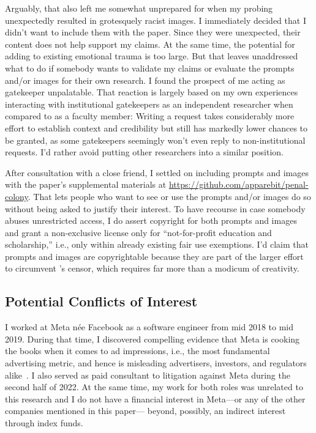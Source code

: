 Arguably, that also left me somewhat unprepared for when my probing unexpectedly
resulted in grotesquely racist images. I immediately decided that I didn't want
to include them with the paper. Since they were unexpected, their content does
not help support my claims. At the same time, the potential for adding to
existing emotional trauma is too large. But that leaves unaddressed what to do
if somebody wants to validate my claims or evaluate the prompts and/or images
for their own research. I found the prospect of me acting as gatekeeper
unpalatable. That reaction is largely based on my own experiences interacting
with institutional gatekeepers as an independent researcher when compared to as
a faculty member: Writing a request takes considerably more effort to establish
context and credibility but still has markedly lower chances to be granted, as
some gatekeepers seemingly won't even reply to non-institutional requests. I'd
rather avoid putting other researchers into a similar position.

After consultation with a close friend, I settled on including prompts and
images with the paper's supplemental materials at
\url{https://github.com/apparebit/penal-colony}. That lets people who want to
see or use the prompts and/or images do so without being asked to justify their
interest. To have recourse in case somebody abuses unrestricted access, I do
assert copyright for both prompts and images and grant a non-exclusive license
only for ``not-for-profit education and scholarship,'' i.e., only within already
existing fair use exemptions. I'd claim that prompts and images are
copyrightable because they are part of the larger effort to circumvent \DALLE's
censor, which requires far more than a modicum of creativity.


\subsection{Potential Conflicts of Interest}

I worked at Meta n\'ee Facebook as a software engineer from mid 2018 to mid
2019. During that time, I discovered compelling evidence that Meta is cooking
the books when it comes to ad impressions, i.e., the most fundamental
advertising metric, and hence is misleading advertisers, investors, and
regulators alike~\cite{grimm2022a}. I also served as paid consultant to
litigation against Meta during the second half of 2022. At the same time, my
work for both roles was unrelated to this research and I do not have a financial
interest in Meta---or any of the other companies mentioned in this paper---%
beyond, possibly, an indirect interest through index funds.
